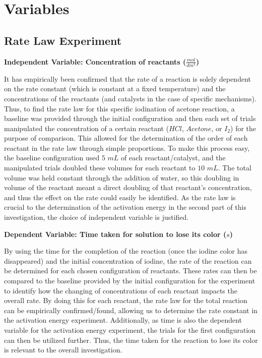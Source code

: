 \section{Variables}

\subsection{Rate Law Experiment}

\textbf{Independent Variable: Concentration of reactants ($\frac{mol}{dm^3}$)} 

It has empirically been confirmed that the rate of a reaction is solely dependent on the rate constant (which is constant at a fixed temperature) and the concentrations of the reactants (and catalysts in the case of specific mechanisms). Thus, to find the rate law for this specific iodination of acetone reaction, a baseline was provided through the initial configuration and then each set of trials manipulated the concentration of a certain reactant ($HCl$, $Acetone$, or $I_2$) for the purpose of comparison. This allowed for the determination of the order of each reactant in the rate law through simple proportions. To make this process easy, the baseline configuration used $5$ $mL$ of each reactant/catalyst, and the manipulated trials doubled these volumes for each reactant to $10$ $mL$. The total volume was held constant through the addition of water, so this doubling in volume of the reactant meant a direct doubling of that reactant's concentration, and thus the effect on the rate could easily be identified. As the rate law is crucial to the determination of the activation energy in the second part of this investigation, the choice of independent variable is justified.

\textbf{Dependent Variable: Time taken for solution to lose its color ($s$)} 

By using the time for the completion of the reaction (once the iodine color has disappeared) and the initial concentration of iodine, the rate of the reaction can be determined for each chosen configuration of reactants. These rates can then be compared to the baseline provided by the initial configuration for the experiment to identify how the changing of concentrations of each reactant impacts the overall rate. By doing this for each reactant, the rate law for the total reaction can be empirically confirmed/found, allowing us to determine the rate constant in the activation energy experiment. Additionally, as time is also the dependent variable for the activation energy experiment, the trials for the first configuration can then be utilized further. Thus, the time taken for the reaction to lose its color is relevant to the overall investigation.

